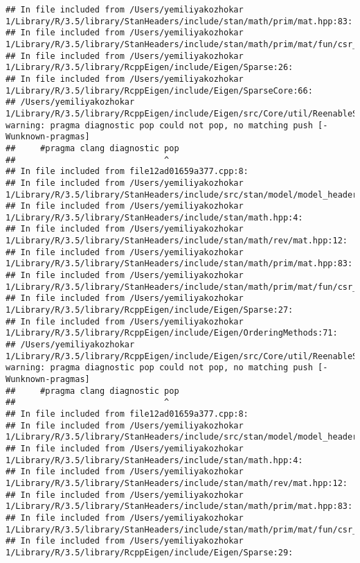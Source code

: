 \documentclass[]{article}
\begin{document}
\begin{verbatim}
## In file included from /Users/yemiliyakozhokar 1/Library/R/3.5/library/StanHeaders/include/stan/math/prim/mat.hpp:83:
## In file included from /Users/yemiliyakozhokar 1/Library/R/3.5/library/StanHeaders/include/stan/math/prim/mat/fun/csr_extract_u.hpp:6:
## In file included from /Users/yemiliyakozhokar 1/Library/R/3.5/library/RcppEigen/include/Eigen/Sparse:26:
## In file included from /Users/yemiliyakozhokar 1/Library/R/3.5/library/RcppEigen/include/Eigen/SparseCore:66:
## /Users/yemiliyakozhokar 1/Library/R/3.5/library/RcppEigen/include/Eigen/src/Core/util/ReenableStupidWarnings.h:10:30: warning: pragma diagnostic pop could not pop, no matching push [-Wunknown-pragmas]
##     #pragma clang diagnostic pop
##                              ^
## In file included from file12ad01659a377.cpp:8:
## In file included from /Users/yemiliyakozhokar 1/Library/R/3.5/library/StanHeaders/include/src/stan/model/model_header.hpp:4:
## In file included from /Users/yemiliyakozhokar 1/Library/R/3.5/library/StanHeaders/include/stan/math.hpp:4:
## In file included from /Users/yemiliyakozhokar 1/Library/R/3.5/library/StanHeaders/include/stan/math/rev/mat.hpp:12:
## In file included from /Users/yemiliyakozhokar 1/Library/R/3.5/library/StanHeaders/include/stan/math/prim/mat.hpp:83:
## In file included from /Users/yemiliyakozhokar 1/Library/R/3.5/library/StanHeaders/include/stan/math/prim/mat/fun/csr_extract_u.hpp:6:
## In file included from /Users/yemiliyakozhokar 1/Library/R/3.5/library/RcppEigen/include/Eigen/Sparse:27:
## In file included from /Users/yemiliyakozhokar 1/Library/R/3.5/library/RcppEigen/include/Eigen/OrderingMethods:71:
## /Users/yemiliyakozhokar 1/Library/R/3.5/library/RcppEigen/include/Eigen/src/Core/util/ReenableStupidWarnings.h:10:30: warning: pragma diagnostic pop could not pop, no matching push [-Wunknown-pragmas]
##     #pragma clang diagnostic pop
##                              ^
## In file included from file12ad01659a377.cpp:8:
## In file included from /Users/yemiliyakozhokar 1/Library/R/3.5/library/StanHeaders/include/src/stan/model/model_header.hpp:4:
## In file included from /Users/yemiliyakozhokar 1/Library/R/3.5/library/StanHeaders/include/stan/math.hpp:4:
## In file included from /Users/yemiliyakozhokar 1/Library/R/3.5/library/StanHeaders/include/stan/math/rev/mat.hpp:12:
## In file included from /Users/yemiliyakozhokar 1/Library/R/3.5/library/StanHeaders/include/stan/math/prim/mat.hpp:83:
## In file included from /Users/yemiliyakozhokar 1/Library/R/3.5/library/StanHeaders/include/stan/math/prim/mat/fun/csr_extract_u.hpp:6:
## In file included from /Users/yemiliyakozhokar 1/Library/R/3.5/library/RcppEigen/include/Eigen/Sparse:29:

\end{verbatim}
\end{document}
